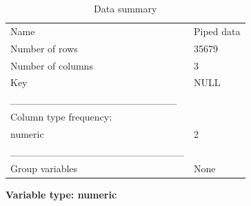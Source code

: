 \documentclass[
  letterpaper,
  DIV=11,
  numbers=noendperiod]{scrreprt}
\begin{document}
\begin{longtable}[]{@{}ll@{}}
\caption{Data summary}\tabularnewline
\toprule()
\endhead
Name & Piped data \\
Number of rows & 35679 \\
Number of columns & 3 \\
Key & NULL \\
\_\_\_\_\_\_\_\_\_\_\_\_\_\_\_\_\_\_\_\_\_\_\_ & \\
Column type frequency: & \\
numeric & 2 \\
\_\_\_\_\_\_\_\_\_\_\_\_\_\_\_\_\_\_\_\_\_\_\_\_ & \\
Group variables & None \\
\bottomrule()
\end{longtable}

\textbf{Variable type: numeric}
\end{document}
